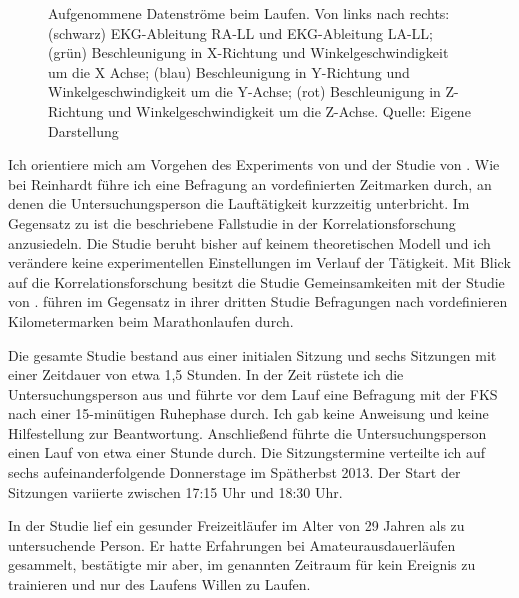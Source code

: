 \begin{sidewaysfigure}
	\resizebox{1.00\textwidth}{!}{%
	    
	}%
	\caption[Aufgenommene Datenströme beim Laufen]{Aufgenommene Datenströme beim Laufen. Von links nach rechts: (schwarz) EKG-Ableitung RA-LL und EKG-Ableitung LA-LL; (grün) Beschleunigung in X-Richtung und Winkelgeschwindigkeit um die X Achse; (blau) Beschleunigung in Y-Richtung und Winkelgeschwindigkeit um die Y-Achse; (rot) Beschleunigung in Z-Richtung und Winkelgeschwindigkeit um die Z-Achse. Quelle: Eigene Darstellung}
	\label{fig:5_2_daten}
\end{sidewaysfigure}

Ich orientiere mich am Vorgehen des Experiments von \citet{Reinhardt2006} und der Studie von \citet{Schuler2009}. Wie bei Reinhardt führe ich eine Befragung an vordefinierten Zeitmarken durch, an denen die Untersuchungsperson die Lauftätigkeit kurzzeitig unterbricht. Im Gegensatz zu \citet{Reinhardt2006} ist die beschriebene Fallstudie in der Korrelationsforschung anzusiedeln. Die Studie beruht bisher auf keinem theoretischen Modell und ich verändere keine experimentellen Einstellungen im Verlauf der Tätigkeit. Mit Blick auf die Korrelationsforschung besitzt die Studie Gemeinsamkeiten mit der Studie von \citet{Schuler2009}. \citet{Schuler2009} führen im Gegensatz in ihrer dritten Studie Befragungen nach vordefinieren Kilometermarken beim Marathonlaufen durch.

Die gesamte Studie bestand aus einer initialen Sitzung und sechs Sitzungen mit einer Zeitdauer von etwa 1,5 Stunden. In der Zeit rüstete ich die Untersuchungsperson aus und führte vor dem Lauf eine Befragung mit der \ac{FKS} nach einer 15-minütigen Ruhephase durch. Ich gab keine Anweisung und keine Hilfestellung zur Beantwortung. Anschließend führte die Untersuchungsperson einen Lauf von etwa einer Stunde durch. Die Sitzungstermine verteilte ich auf sechs aufeinanderfolgende Donnerstage im Spätherbst 2013. Der Start der Sitzungen variierte zwischen 17:15 Uhr und 18:30 Uhr.

In der Studie lief ein gesunder Freizeitläufer im Alter von 29 Jahren als zu untersuchende Person. Er hatte Erfahrungen bei Amateurausdauerläufen gesammelt, bestätigte mir aber, im genannten Zeitraum für kein Ereignis zu trainieren und nur des Laufens Willen zu Laufen.

